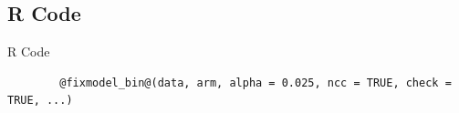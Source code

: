 \documentclass[10pt]{beamer} %
\begin{document}
\subsection{R Code}

\begin{frame}[fragile]{R Code}
	
	\begin{lstlisting}
		@fixmodel_bin@(data, arm, alpha = 0.025, ncc = TRUE, check = TRUE, ...)
	\end{lstlisting}  
	
\end{frame}
\end{document}
